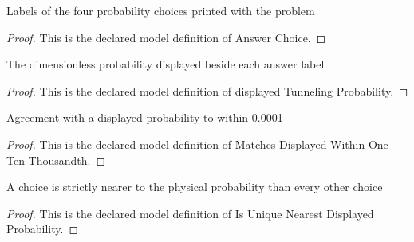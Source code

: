 \begin{definition}
  \label{def:physics:phyx-mini-0533:phyxminiproblems-problemphyxmini0533-answerchoice}
  Labels of the four probability choices printed with the problem
\end{definition}
\begin{proof}
  This is the declared model definition of Answer Choice.
\end{proof}
\begin{definition}
  \label{def:physics:phyx-mini-0533:phyxminiproblems-problemphyxmini0533-displayedtunnelingprobability}
  The dimensionless probability displayed beside each answer label
\end{definition}
\begin{proof}
  This is the declared model definition of displayed Tunneling Probability.
\end{proof}
\begin{definition}
  \label{def:physics:phyx-mini-0533:phyxminiproblems-problemphyxmini0533-matchesdisplayedwithinonetenthousandth}
  Agreement with a displayed probability to within 0.0001
\end{definition}
\begin{proof}
  This is the declared model definition of Matches Displayed Within One Ten Thousandth.
\end{proof}
\begin{definition}
  \label{def:physics:phyx-mini-0533:phyxminiproblems-problemphyxmini0533-isuniquenearestdisplayedprobability}
  A choice is strictly nearer to the physical probability than every other choice
\end{definition}
\begin{proof}
  This is the declared model definition of Is Unique Nearest Displayed Probability.
\end{proof}
